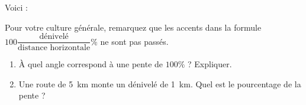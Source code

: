 
\begin{exercice}\label{exosmath-0836}

    Voici  :\\

{\tiny Pour votre culture générale, remarquez que les accents dans la formule \( 100\dfrac{ \text{dénivelé} }{ \text{distance horizontale} }\%\) ne sont pas passés.}

\begin{enumerate}
    \item
        À quel angle correspond à une pente de \( 100\%\) ? Expliquer.
    \item
        Une route de \SI{5}{\kilo\meter} monte un dénivelé de \SI{1}{\kilo\meter}. Quel est le pourcentage de la pente ?
\end{enumerate}

\end{exercice}
